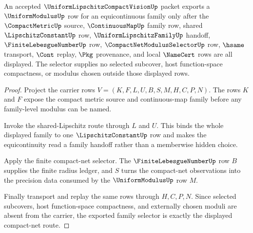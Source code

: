 \begin{theorem}
\label{thm:compact-uniform-equicontinuous-family-selector}
An accepted $\UniformLipschitzCompactVisionUp$ packet exports a $\UniformModulusUp$ row for an equicontinuous family only after the $\CompactMetricUp$ source, $\ContinuousMapUp$ family row, shared $\LipschitzConstantUp$ row, $\UniformLipschitzFamilyUp$ handoff, $\FiniteLebesgueNumberUp$ row, $\CompactNetModulusSelectorUp$ row, $\hsame$ transport, $\Cont$ replay, $\Pkg$ provenance, and local $\NameCert$ rows are all displayed. The selector supplies no selected subcover, host function-space compactness, or modulus chosen outside those displayed rows.
\end{theorem}
\begin{proof}
Project the carrier rows $V=(K,F,L,U,B,S,M,H,C,P,N)$. The rows $K$ and $F$ expose the compact metric source and continuous-map family before any family-level modulus can be named.

Invoke the shared-Lipschitz route through $L$ and $U$. This binds the whole displayed family to one $\LipschitzConstantUp$ row and makes the equicontinuity read a family handoff rather than a memberwise hidden choice.

Apply the finite compact-net selector. The $\FiniteLebesgueNumberUp$ row $B$ supplies the finite radius ledger, and $S$ turns the compact-net observations into the precision data consumed by the $\UniformModulusUp$ row $M$.

Finally transport and replay the same rows through $H,C,P,N$. Since selected subcovers, host function-space compactness, and externally chosen moduli are absent from the carrier, the exported family selector is exactly the displayed compact-net route.
\end{proof}



